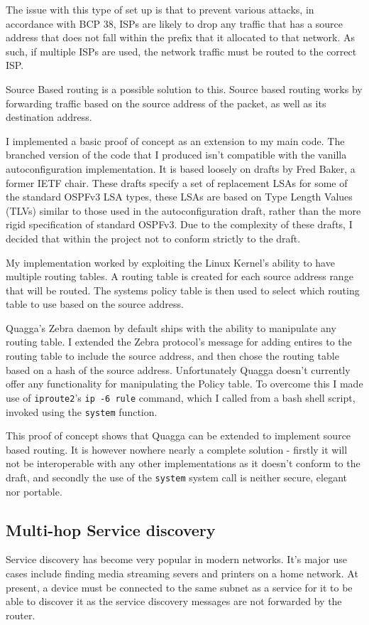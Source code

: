 \documentclass[12pt]{report}
\begin{document}
The issue with this type of set up is that to prevent various attacks, in
accordance with BCP 38, ISPs are likely to drop any traffic that has a source
address that does not fall within the prefix that it allocated to that network.
As such, if multiple ISPs are used, the network traffic must be routed to the
correct ISP. 

Source Based routing is a possible solution to this. Source based routing works
by forwarding traffic based on the source address of the packet, as well as its
destination address. 

I implemented a basic proof of concept as an extension to my main code. The
branched version of the code that I produced isn't compatible with the vanilla
autoconfiguration implementation. It is based loosely on drafts by Fred Baker,
a former IETF chair. These drafts specify a set of replacement LSAs for some of
the standard OSPFv3 LSA types, these LSAs are based on Type Length Values
(TLVs) similar to those used in the autoconfiguration draft, rather than the
more rigid specification of standard OSPFv3. Due to the complexity of these
drafts, I decided that within the project not to conform strictly to the
draft.

My implementation worked by exploiting the Linux Kernel's ability to have
multiple routing tables. A routing table is created for each source address
range that will be routed. The systems policy table is then used to select
which routing table to use based on the source address.  

Quagga's Zebra daemon by default ships with the ability to manipulate any
routing table. I extended the Zebra protocol's message for adding entires to
the routing table to include the source address, and then chose the routing
table based on a hash of the source address.  Unfortunately Quagga doesn't
currently offer any functionality for manipulating the Policy table. To
overcome this I made use of \texttt{iproute2}'s \texttt{ip -6 rule} command,
which I called from a bash shell script, invoked using the \texttt{system}
function. 

This proof of concept shows that Quagga can be extended to implement source
based routing. It is however nowhere nearly a complete solution - firstly it
will not be interoperable with any other implementations as it doesn't conform
to the draft, and secondly the use of the \texttt{system} system call is
neither secure, elegant nor portable. 


\subsection{Multi-hop Service discovery}
Service discovery has become very popular in modern networks. It's major use
cases include finding media streaming severs and printers on a home network. At
present, a device must be connected to the same subnet as a service for it to
be able to discover it as the service discovery messages are not forwarded by
the router. 
\end{document}
